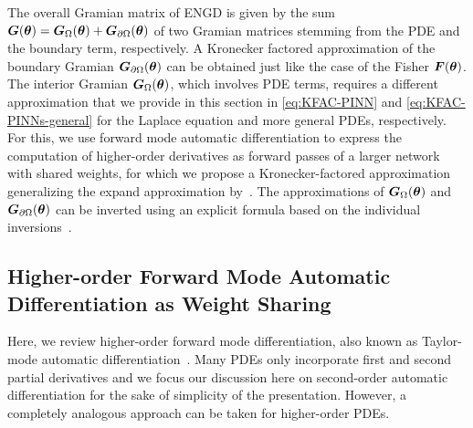 
The overall Gramian matrix of ENGD is given by the sum ${\bm{G}}({\bm{\theta}})= {\bm{G}}_\Omega({\bm{\theta}}) + {\bm{G}}_{\partial\Omega}({\bm{\theta}})$ of two Gramian matrices stemming from the PDE and the boundary term, respectively.
A Kronecker factored approximation of the boundary Gramian ${\bm{G}}_{\partial\Omega}({\bm{\theta}})$ can be obtained just like the case of the  Fisher ${\bm{F}}({\bm{\theta}})$.
The interior Gramian ${\bm{G}}_\Omega({\bm{\theta}})$, which involves PDE terms, requires a different approximation that we provide in this section in \eqref{eq:KFAC-PINN} and \eqref{eq:KFAC-PINNs-general} for the Laplace equation and more general PDEs, respectively. 
For this, we use forward mode automatic differentiation to express the computation of higher-order derivatives as forward passes of a larger network with shared weights, for which we propose a Kronecker-factored approximation generalizing the expand approximation by~\citet{eschenhagen2023kroneckerfactored}.
The approximations of ${\bm{G}}_{\Omega}({\bm{\theta}})$ and ${\bm{G}}_{\partial\Omega}({\bm{\theta}})$ can be %
inverted using an explicit formula based on the individual inversions~\citep{martens2015optimizing}.

\subsection{Higher-order Forward Mode Automatic Differentiation as Weight Sharing}
\label{sec:taylor-mode-AD}

Here, we review higher-order forward mode differentiation, also known as {Taylor-mode automatic differentiation}~\citep{griewank1996algorithm, griewank2008evaluating, bettencourt2019taylor}.
Many PDEs only incorporate first and second partial derivatives and we focus our discussion here on second-order automatic differentiation for the sake of simplicity of the presentation.
However, a completely analogous approach can be taken for higher-order PDEs.

